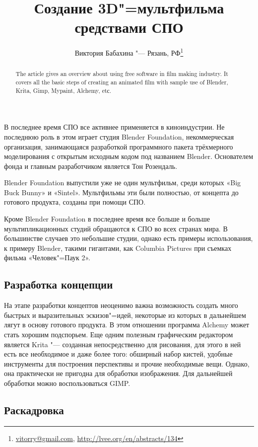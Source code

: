 \documentclass[10pt, a5paper]{article}
\begin{document}
\title{Создание 3D"=мультфильма средствами СПО}
\author{Виктория Бабахина "--- Рязань, РФ\footnote{\url{vitorry@gmail.com}, \url{http://lvee.org/en/abstracts/134}}}
\maketitle
\begin{abstract}
The article gives an overview about using free software in film making industry. It covers all the basic steps of creating an animated film with sample use of Blender, Krita, Gimp, Mypaint, Alchemy, etс.
\end{abstract}
В последнее время СПО все активнее применяется в киноиндустрии. Не последнюю роль в этом играет студия Blender Foundation, некоммерческая организация, занимающаяся разработкой програм\-много пакета трёхмерного моделирования с открытым исходным кодом под названием Blender. Основателем фонда и главным разработчиком является Тон Розендаль.

Blender Foundation выпустили уже не один мультфильм, среди которых «Big Buck Bunny» и «Sintel». Мультфильмы эти были полностью, от концепта до готового продукта, созданы при помощи СПО.

Кроме  Blender Foundation в последнее время все больше и больше мультипликационных студий обращаются к СПО во всех странах мира. В большинстве случаев это небольшие студии, однако есть примеры использования, к примеру Blender, такими гигантами, как Columbia Pictures при съемках фильма «Человек"=Паук 2».

\subsection*{Разработка концепции}

На этапе разработки концептов неоценимо важна возможность создать много быстрых и выразительных эскизов"=идей, некоторые из которых в дальнейшем лягут в основу готового продукта. В этом отношении  программа  Alchemy может стать хорошим подспорьем. Еще одним полезным графическим редактором является Krita "--- созданная непосредственно для рисования, для этого в ней есть все необходимое и даже более того: обширный набор кистей, удобные инструменты для построения перспективы и прочие необходимые вещи. Однако, она практически не пригодна для обработки изображения. Для дальнейшей обработки можно воспользоваться GIMP.

\subsection*{Раскадровка}
\end{document}
